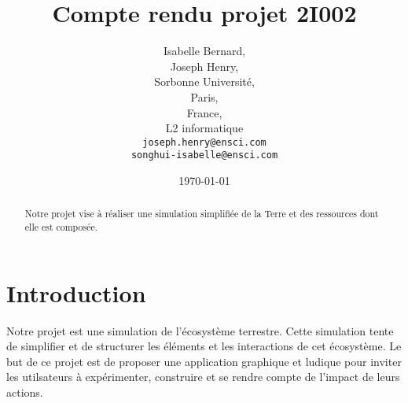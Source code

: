 \documentclass[11pt,a4paper]{article}
\begin{document}
\title{Compte rendu projet 2I002}
\author{Isabelle Bernard,\\
	Joseph Henry,\\
   Sorbonne Université,\\
   Paris,\\
   France,\\
   L2 informatique\\
   \texttt{joseph.henry@ensci.com}\\
   \texttt{songhui-isabelle@ensci.com}}
\date{\today}
\maketitle

\vspace{5\baselineskip}
\begin{abstract}
Notre projet vise à réaliser une simulation simplifiée de la Terre et des ressources dont elle est composée.
\end{abstract}

\newpage

\part{Introduction}
Notre projet est une simulation de l'écosystème terrestre. Cette simulation tente de simplifier et de structurer les éléments et les interactions de cet écosystème.
Le but de ce projet est de proposer une application graphique et ludique pour inviter les utilsateurs à expérimenter, construire et se rendre compte de l'impact de leurs actions.
\end{document}
